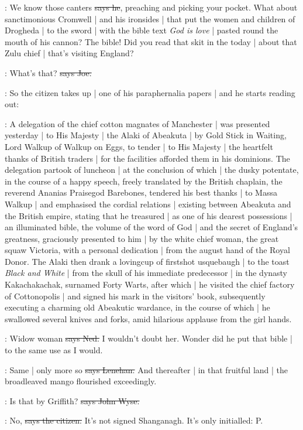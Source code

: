 \citizen:
We know those canters
\sout{says he},
preaching and picking your pocket.
What about sanctimonious Cromwell |
and his ironsides |
that put the women and children of Drogheda |
to the sword |
with the bible text \emph{God is love} |
pasted round the mouth of his cannon?
The bible!
Did you read that skit in the  today |
about that Zulu chief |
that's visiting England?

\joe:
What's that?
\sout{says Joe.}

\Nq:
So the citizen takes up |
one of his paraphernalia papers |
and he starts reading out:

\citizen:
A delegation of the chief cotton magnates of Manchester |
was presented yesterday |
to His Majesty |
the Alaki of Abeakuta |
by Gold Stick in Waiting,
Lord Walkup of Walkup on Eggs,
to tender |
to His Majesty |
the heartfelt thanks of British traders |
for the facilities afforded them in his dominions.
The delegation partook of luncheon |
at the conclusion of which |
the dusky potentate,
in the course of a happy speech,
freely translated by the British chaplain,
the reverend Ananias Praisegod Barebones,
tendered his best thanks |
to Massa Walkup |
and emphasised the cordial relations |
existing between Abeakuta and the British empire,
stating that he treasured |
as one of his dearest possessions |
an illuminated bible,
the volume of the word of God |
and the secret of England's greatness,
graciously presented to him |
by the white chief woman,
the great squaw Victoria,
with a personal dedication |
from the august hand of the Royal Donor.
The Alaki then drank a lovingcup of firstshot usquebaugh |
to the toast \emph{Black and White} |
from the skull of his immediate predecessor |
in the dynasty Kakachakachak,
surnamed Forty Warts,
after which |
he visited the chief factory of Cottonopolis |
and signed his mark in the visitors' book,
subsequently executing a charming old Abeakutic wardance,
in the course of which |
he swallowed several knives and forks,
amid hilarious applause from the girl hands.

\lambert:
Widow woman
\sout{says Ned.}
I wouldn't doubt her.
Wonder did he put that bible |
to the same use as I would.

\lenehan:
Same |
only more so
\sout{says Lenehan.}
And thereafter |
in that fruitful land |
the broadleaved mango flourished exceedingly.

\johnwyse:
Is that by Griffith?
\sout{says John Wyse.}

\citizen:
No,
\sout{says the citizen.}
It's not signed Shanganagh.
It's only initialled:
P.

